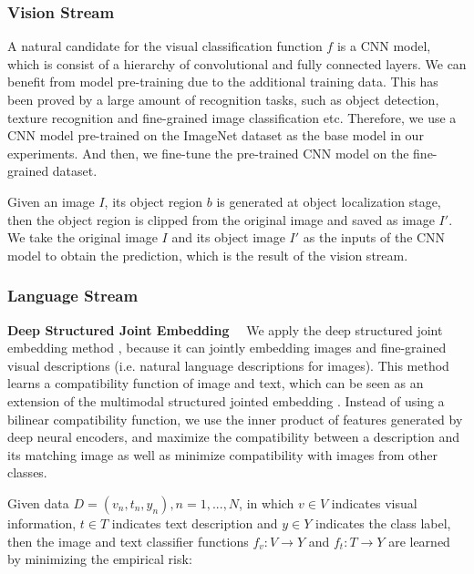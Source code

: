 \documentclass[10pt,twocolumn,letterpaper]{article}
\begin{document}
\subsubsection{Vision Stream} 
A natural candidate for the visual classification function $f$ is a CNN model, which is consist of a hierarchy of convolutional and fully connected layers. We can benefit from model pre-training due to the additional training data. This has been proved by a large amount of recognition tasks, such as object detection, texture recognition and fine-grained image classification \cite{cimpoi2014describing,donahue2014decaf,rcnn,sharif2014cnn} etc. Therefore, we use a CNN model pre-trained on the ImageNet dataset \cite{imagenet} as the base model in our experiments. And then, we fine-tune the pre-trained CNN model on the fine-grained dataset. 
\par
Given an image $I$, its object region $b$ is generated at object localization stage, then the object region is clipped from the original image and saved as image $I'$. We take the original image $I$ and its object image $I'$ as the inputs of the CNN model to obtain the prediction, which is the result of the vision stream.
\subsubsection{Language Stream} 
\textbf{Deep Structured Joint Embedding} \ \ We apply the deep structured joint embedding method \cite{deeprepresentations}, because it can jointly embedding images and fine-grained visual descriptions (i.e. natural language descriptions for images). This method learns a compatibility function of image and text, which can be seen as an extension of the multimodal structured jointed embedding \cite{akata2015evaluation}. Instead of using a bilinear compatibility function, we use the inner product of features generated by deep neural encoders, and maximize the compatibility between a description and its matching image as well as minimize compatibility with images from other classes. 


\par
Given data $D={(v_n,t_n,y_n), n=1, ..., N}$, in which $v \in V$ indicates visual information, $t \in T$ indicates text description and $y \in Y$ indicates the class label, then the image and text classifier functions $f_v : V \to Y$ and $f_t : T \to Y$ are learned by minimizing the empirical risk:
\end{document}
